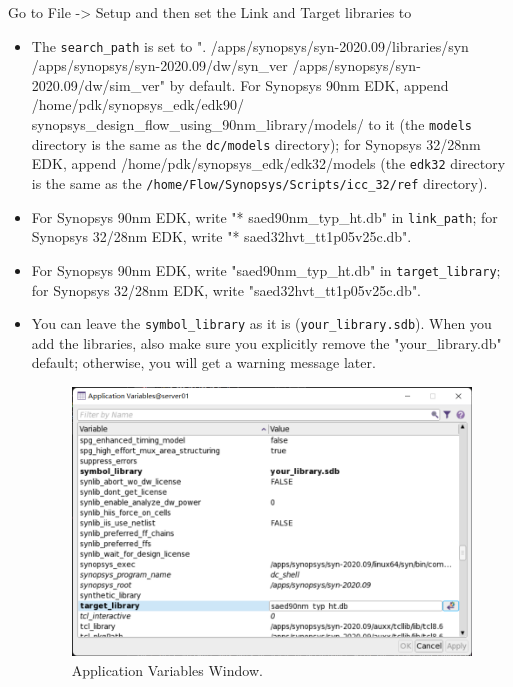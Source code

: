 \documentclass[a4paper,12pt,twoside]{article}
\begin{document}
\begin{enumerate}
    Go to File -> Setup and then set the Link and Target libraries to
    \begin{itemize}
        \item The \texttt{search\_path} is set to ". /apps/synopsys/syn-2020.09/libraries/syn\\
        /apps/synopsys/syn-2020.09/dw/syn\_ver /apps/synopsys/syn-2020.09/dw/sim\_ver" by default. For Synopsys 90nm EDK, append /home/pdk/synopsys\_edk/edk90/\\
        synopsys\_design\_flow\_using\_90nm\_library/models/ to it (the \texttt{models} directory is the same as the \texttt{dc/models} directory); for Synopsys 32/28nm EDK, append /home/pdk/synopsys\_edk/edk32/models (the \texttt{edk32} directory is the same as the \texttt{/home/Flow/Synopsys/Scripts/icc\_32/ref} directory).
        \item For Synopsys 90nm EDK, write "* saed90nm\_typ\_ht.db" in \texttt{link\_path}; for Synopsys 32/28nm EDK, write "* saed32hvt\_tt1p05v25c.db".
        \item For Synopsys 90nm EDK, write "saed90nm\_typ\_ht.db" in \texttt{target\_library}; for Synopsys 32/28nm EDK, write "saed32hvt\_tt1p05v25c.db".
        \item You can leave the \texttt{symbol\_library} as it is (\texttt{your\_library.sdb}). When you add the libraries, also make sure you explicitly remove the "your\_library.db" default; otherwise, you will get a warning message later.
        \begin{figure}[H]
            \centering
            \includegraphics[width=\textwidth]{images/18.png}
            \caption{Application Variables Window.}
        \end{figure}

\end{itemize}
\end{enumerate}
\end{document}

